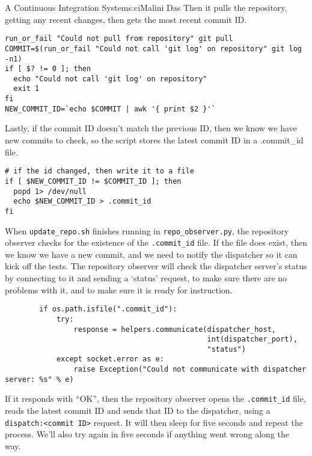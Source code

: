 \begin{aosachapter}{A Continuous Integration System}{s:ci}{Malini Das}
Then it pulls the repository, getting any recent changes, then gets the
most recent commit ID.

\begin{verbatim}
run_or_fail "Could not pull from repository" git pull
COMMIT=$(run_or_fail "Could not call 'git log' on repository" git log -n1)
if [ $? != 0 ]; then
  echo "Could not call 'git log' on repository"
  exit 1
fi
NEW_COMMIT_ID=`echo $COMMIT | awk '{ print $2 }'`
\end{verbatim}

Lastly, if the commit ID doesn't match the previous ID, then we know we
have new commits to check, so the script stores the latest commit ID in
a .commit\_id file.

\begin{verbatim}
# if the id changed, then write it to a file
if [ $NEW_COMMIT_ID != $COMMIT_ID ]; then
  popd 1> /dev/null
  echo $NEW_COMMIT_ID > .commit_id
fi
\end{verbatim}

When \texttt{update\_repo.sh} finishes running in
\texttt{repo\_observer.py}, the repository observer checks for the
existence of the \texttt{.commit\_id} file. If the file does exist, then
we know we have a new commit, and we need to notify the dispatcher so it
can kick off the tests. The repository observer will check the
dispatcher server's status by connecting to it and sending a `status'
request, to make sure there are no problems with it, and to make sure it
is ready for instruction.

\begin{verbatim}
        if os.path.isfile(".commit_id"):
            try:
                response = helpers.communicate(dispatcher_host,
                                               int(dispatcher_port),
                                               "status")
            except socket.error as e:
                raise Exception("Could not communicate with dispatcher server: %s" % e)
\end{verbatim}

If it responds with ``OK'', then the repository observer opens the
\texttt{.commit\_id} file, reads the latest commit ID and sends that ID
to the dispatcher, using a
\texttt{dispatch:\textless{}commit ID\textgreater{}} request. It will
then sleep for five seconds and repeat the process. We'll also try again
in five seconds if anything went wrong along the way.


\end{aosachapter}
